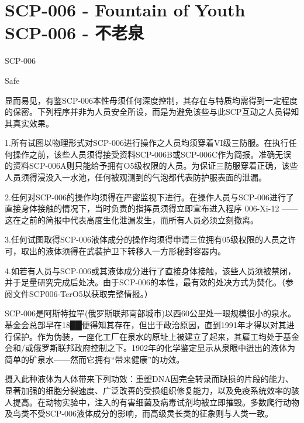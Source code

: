 \chapter[SCP-006 不老泉]{
	SCP-006 - Fountain of Youth\\
	SCP-006 - 不老泉
}

\label{chap:SCP-006}



SCP-006

Safe

显而易见，有鉴SCP-006本性毋须任何深度控制，其存在与特质均需得到一定程度的保密。下列程序并非为人员安全所设，而是为避免该些与此SCP互动之人员得知其真实效果。

1.所有试图以物理形式对SCP-006进行操作之人员均须穿着VI级三防服。在执行任何操作之前，该些人员须得接受资料SCP-006B或SCP-006C作为简报。准确无误的资料SCP-006A则只能给予拥有O5级权限的人员。为保证三防服穿着正确，该些人员须得浸没入一水池，任何被观测到的气泡都代表防护服表面的泄漏。

2.任何对SCP-006的操作均须得在严密监视下进行。在操作人员与SCP-006进行了直接身体接触的情况下，当时负责的指挥员须得立即宣布进入程序 006-Xi-12 ——这在之前的简报中代表高度生化泄漏发生，而所有人员必须立刻撤离。

3.任何试图取得SCP-006液体成分的操作均须得申请三位拥有05级权限的人员之许可，取出的液体须得在武装护卫下转移入一方形秘封容器内。

4.如若有人员与SCP-006或其液体成分进行了直接身体接触，该些人员须被禁闭，并于足量研究完成后处决。由于SCP-006的本性，最有效的处决方式为焚化。（参阅文件SCP006-TerO5以获取完整情报。）

SCP-006是阿斯特拉罕(俄罗斯联邦南部城市)以西60公里处一眼规模很小的泉水。基金会总部早在18██便得知其存在，但出于政治原因，直到1991年才得以对其进行保护。作为伪装，一座化工厂在泉水的原址上被建立了起来，其雇工均处于基金会和/或俄罗斯联邦政府控制之下。1902年的化学鉴定显示从泉眼中迸出的液体为简单的矿泉水——然而它拥有“带来健康”的功效。

摄入此种液体为人体带来下列功效：重塑DNA因完全转录而缺损的片段的能力、显著加强的细胞分裂速度、广泛改善的受损组织修复能力，以及免疫系统效率的骇人提高。在动物实验中，注入的有害细菌及病毒试剂均被立即摧毁。多数爬行动物及鸟类不受SCP-006液体成分的影响，而高级灵长类的征象则与人类一致。
